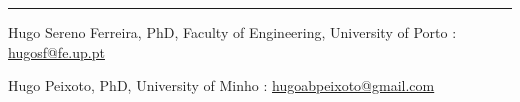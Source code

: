 \begin{center}
\rule{0.5\textwidth}{.4pt}
\end{center}
\begin{cventries}
 
      \begin{cvitems}
        \item \textnormal{{Hugo Sereno Ferreira, PhD, Faculty of Engineering, University of Porto :  \href{mailto:hugosf@fe.up.pt}{hugosf@fe.up.pt}}}
        \item \textnormal{{Hugo Peixoto, PhD, University of Minho : \href{mailto:hugoabpeixoto@gmail.com}{hugoabpeixoto@gmail.com}}}
      \end{cvitems}
    
\end{cventries}    
